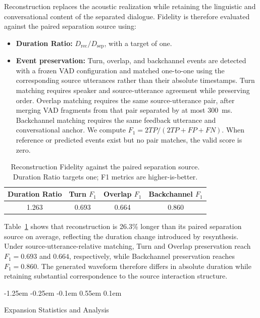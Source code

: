 \documentclass[10pt,twocolumn]{article}
\makeatletter
\renewcommand\subsection{%
  \@startsection{subsection}{2}{\z@}%
    {-1.25em \@plus -0.25em \@minus -0.1em}%
    {0.55em \@plus 0.1em}%
    {\normalfont\fontsize{10.5}{12.5}\selectfont\bfseries\raggedright
     \hyphenpenalty=10000\exhyphenpenalty=10000}}
\makeatother
\begin{document}
Reconstruction replaces the acoustic realization while retaining the linguistic and conversational content of the separated dialogue. Fidelity is therefore evaluated against the paired separation source using:
\begin{itemize}
    \item \textbf{Duration Ratio:} $D_{\mathrm{rec}}/D_{\mathrm{sep}}$, with a target of one.
    \item \textbf{Event preservation:} Turn, overlap, and backchannel events are detected with a frozen VAD configuration and matched one-to-one using the corresponding source utterances rather than their absolute timestamps. Turn matching requires speaker and source-utterance agreement while preserving order. Overlap matching requires the same source-utterance pair, after merging VAD fragments from that pair separated by at most 300~ms. Backchannel matching requires the same feedback utterance and conversational anchor. We compute $F_1=2TP/(2TP+FP+FN)$. When reference or predicted events exist but no pair matches, the valid score is zero.
\end{itemize}

\begin{table}[t]
\centering
\caption{Reconstruction Fidelity against the paired separation source. Duration Ratio targets one; F1 metrics are higher-is-better.}
\label{tab:reconstruction}
\small
\begin{tabular}{cccc}
\toprule
Duration Ratio & Turn $F_1$ & Overlap $F_1$ & Backchannel $F_1$ \\
\midrule
1.263 & 0.693 & 0.664 & 0.860 \\
\bottomrule
\end{tabular}
\end{table}

Table~\ref{tab:reconstruction} shows that reconstruction is 26.3\% longer than its paired separation source on average, reflecting the duration change introduced by resynthesis. Under source-utterance-relative matching, Turn and Overlap preservation reach $F_1=0.693$ and $0.664$, respectively, while Backchannel preservation reaches $F_1=0.860$. The generated waveform therefore differs in absolute duration while retaining substantial correspondence to the source interaction structure.

\subsection{Expansion Statistics and Analysis}
\end{document}
